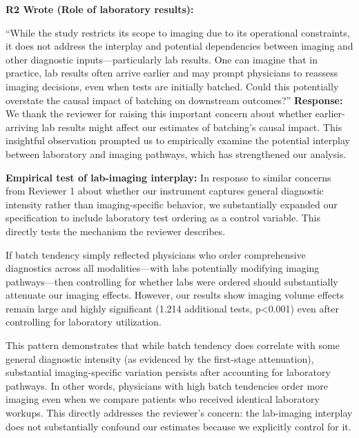 \documentclass[11pt]{article}
\newenvironment{quote2}
{ \bigskip
\noindent
         \small\em
         \baselineskip=14pt
}
\newcommand{\1}{\hbox{\rm 1\kern-.35em 1}}
\begin{document}
\color{black}

\begin{quote2}
\textbf{R2 Wrote (Role of laboratory results):}  

\noindent``While the study restricts its scope to imaging due to its operational constraints, it does not address the interplay and potential dependencies between imaging and other diagnostic inputs—particularly lab results. One can imagine that in practice, lab results often arrive earlier and may prompt physicians to reassess imaging decisions, even when tests are initially batched. Could this potentially overstate the causal impact of batching on downstream outcomes?” 
\end{quote2}

\noindent\textbf{Response:} \color{blue}
We thank the reviewer for raising this important concern about whether earlier-arriving lab results might affect our estimates of batching's causal impact. This insightful observation prompted us to empirically examine the potential interplay between laboratory and imaging pathways, which has strengthened our analysis.

\textbf{Empirical test of lab-imaging interplay:} In response to similar concerns from Reviewer 1 about whether our instrument captures general diagnostic intensity rather than imaging-specific behavior, we substantially expanded our specification to include laboratory test ordering as a control variable. This directly tests the mechanism the reviewer describes.

If batch tendency simply reflected physicians who order comprehensive diagnostics across all modalities—with labs potentially modifying imaging pathways—then controlling for whether labs were ordered should substantially attenuate our imaging effects. However, our results show imaging volume effects remain large and highly significant (1.214 additional tests, p<0.001) even after controlling for laboratory utilization.

This pattern demonstrates that while batch tendency does correlate with some general diagnostic intensity (as evidenced by the first-stage attenuation), substantial imaging-specific variation persists after accounting for laboratory pathways. In other words, physicians with high batch tendencies order more imaging even when we compare patients who received identical laboratory workups. This directly addresses the reviewer's concern: the lab-imaging interplay does not substantially confound our estimates because we explicitly control for it.
\end{document}
